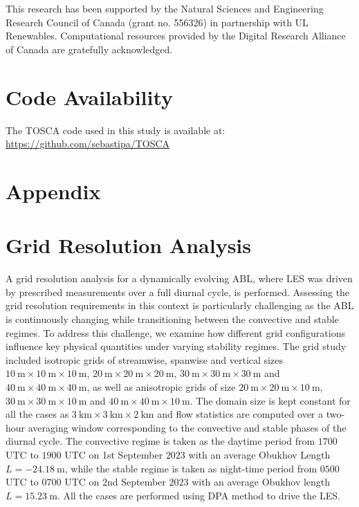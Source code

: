 \begin{acknowledgements}
This research has been supported by the Natural Sciences and Engineering Research Council of Canada (grant no. 556326) in partnership with UL Renewables. Computational resources provided by the Digital Research Alliance of Canada are gratefully acknowledged.
 
\end{acknowledgements} 

\section*{Code Availability}
The TOSCA code used in this study is available at: \url{https://github.com/sebastipa/TOSCA}

\clearpage
\appendix
\section*{Appendix}
\setcounter{section}{0} %
\renewcommand{\thesection}{A\arabic{section}} %
\section{Grid Resolution Analysis}
\label{sec:GRAstudy}

A grid resolution analysis for a dynamically evolving ABL, where LES was driven by prescribed measurements over a full diurnal cycle, is performed. Assessing the grid resolution requirements in this context is particularly challenging as the ABL is continuously changing while transitioning between the convective and stable regimes. To address this challenge, we examine how different grid configurations influence key physical quantities under varying stability regimes. The grid study included isotropic grids of streamwise, spanwise and vertical sizes $10~\mathrm{m} \times 10~\mathrm{m} \times 10~\mathrm{m}$, $20~\mathrm{m} \times 20~\mathrm{m} \times 20~\mathrm{m}$, $30~\mathrm{m} \times 30~\mathrm{m} \times 30~\mathrm{m}$ and $40~\mathrm{m} \times 40~\mathrm{m} \times 40~\mathrm{m}$, as well as anisotropic grids of size $20~\mathrm{m} \times 20~\mathrm{m} \times 10~\mathrm{m}$, $30~\mathrm{m} \times 30~\mathrm{m} \times 10~\mathrm{m}$ and $40~\mathrm{m} \times 40~\mathrm{m} \times 10~\mathrm{m}$. The domain size is kept constant for all the cases as $3~\mathrm{km} \times 3~\mathrm{km} \times 2~\mathrm{km}$ and flow statistics are computed over a two-hour averaging window corresponding to the convective and stable phases of the diurnal cycle. The convective regime is taken as the daytime period from $1700$ UTC to $1900$ UTC on 1st September $2023$ with an average Obukhov Length  $L = -24.18~\mathrm{m}$, while the stable regime is taken as night-time period from $0500$ UTC to $0700$ UTC on 2nd September $2023$ with an average Obukhov length $L = 15.23~\mathrm{m}$. All the cases are performed using DPA method to drive the LES. 

